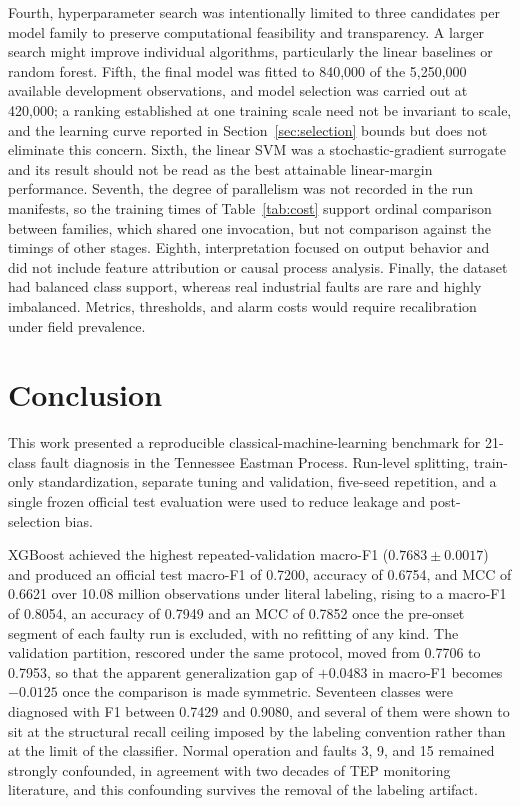 \documentclass[10pt,twocolumn,a4paper]{article}
\begin{document}
Fourth, hyperparameter search was intentionally limited to three candidates per
model family to preserve computational feasibility and transparency. A larger
search might improve individual algorithms, particularly the linear baselines
or random forest. Fifth, the final model was fitted to 840,000 of the 5,250,000
available development observations, and model selection was carried out at
420,000; a ranking established at one training scale need not be invariant to
scale, and the learning curve reported in Section~\ref{sec:selection} bounds but
does not eliminate this concern. Sixth, the linear SVM was a stochastic-gradient
surrogate and its result should not be read as the best attainable
linear-margin performance. Seventh, the degree of parallelism was not recorded in the run manifests, so
the training times of Table~\ref{tab:cost} support ordinal comparison between
families, which shared one invocation, but not comparison against the timings
of other stages. Eighth, interpretation focused on output behavior
and did not include feature attribution or causal process analysis. Finally, the
dataset had balanced class support, whereas real industrial faults are rare and
highly imbalanced. Metrics, thresholds, and alarm costs would require
recalibration under field prevalence.

\section{Conclusion}

This work presented a reproducible classical-machine-learning benchmark for
21-class fault diagnosis in the Tennessee Eastman Process. Run-level splitting,
train-only standardization, separate tuning and validation, five-seed repetition,
and a single frozen official test evaluation were used to reduce leakage and
post-selection bias.

XGBoost achieved the highest repeated-validation macro-F1
($0.7683\pm0.0017$) and produced an official test macro-F1 of 0.7200, accuracy
of 0.6754, and MCC of 0.6621 over 10.08 million observations under literal
labeling, rising to a macro-F1 of 0.8054, an accuracy of 0.7949 and an MCC of
0.7852 once the pre-onset segment of each faulty run is excluded, with no
refitting of any kind. The validation partition, rescored under the same
protocol, moved from 0.7706 to 0.7953, so that the apparent generalization gap
of $+0.0483$ in macro-F1 becomes $-0.0125$ once the comparison is made
symmetric. Seventeen classes were diagnosed with F1 between
0.7429 and 0.9080, and several of them were shown to sit at the structural
recall ceiling imposed by the labeling convention rather than at the limit of
the classifier. Normal operation and faults 3, 9, and 15 remained strongly
confounded, in agreement with two decades of TEP monitoring literature, and
this confounding survives the removal of the labeling artifact.
\end{document}
